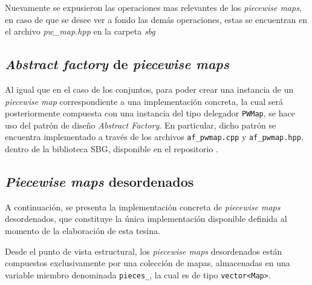 Nuevamente se expusieron las operaciones mas relevantes de los \textit{piecewise maps}, en caso de que se desee ver a fondo las demás operaciones, estas se encuentran en el archivo \textit{pw\_map.hpp} en la carpeta \textit{sbg}

\subsection{\textit{Abstract factory} de \textit{piecewise maps}}

Al igual que en el caso de los conjuntos, para poder crear una instancia de un \textit{piecewise map} correspondiente a una implementación concreta, la cual será posteriormente compuesta con una instancia del tipo delegador \texttt{PWMap}, se hace uso del patrón de diseño \textit{Abstract Factory}.  
En particular, dicho patrón se encuentra implementado a través de los archivos \texttt{af\_pwmap.cpp} y \texttt{af\_pwmap.hpp}, dentro de la biblioteca SBG, disponible en el repositorio \cite{sbg}.

\subsection{\textit{Piecewise maps} desordenados}\label{sec:pwmaps-des}

A continuación, se presenta la implementación concreta de \textit{piecewise maps} desordenados, que constituye la única implementación disponible definida al momento de la elaboración de esta tesina.

Desde el punto de vista estructural, los \textit{piecewise maps} desordenados están compuestos exclusivamente por una colección de mapas, almacenadas en una variable miembro denominada \texttt{pieces\_}, la cual es de tipo \texttt{vector<Map>}.

